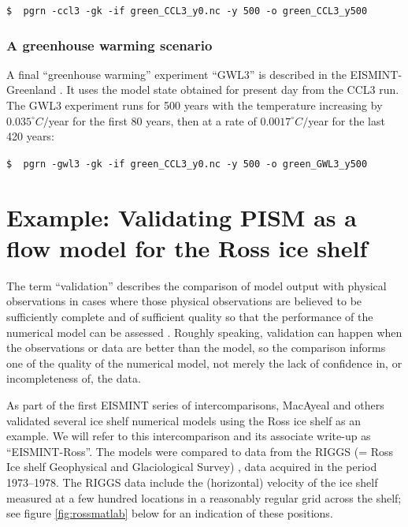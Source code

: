 \documentclass[11pt,final]{amsart}
\begin{document}
\verb|$  pgrn -ccl3 -gk -if green_CCL3_y0.nc -y 500 -o green_CCL3_y500|


\subsubsection*{A greenhouse warming scenario}  A final ``greenhouse warming'' experiment ``GWL3'' is described in the EISMINT-Greenland \cite{RitzEISMINT}.  It uses the model state obtained for present day from the CCL3 run.  The GWL3 experiment  runs for 500 years with the temperature increasing by $0.035^\circ C/$year for the first 80 years, then at a rate of $0.0017^\circ C/$year for the last 420 years:

\verb|$  pgrn -gwl3 -gk -if green_CCL3_y0.nc -y 500 -o green_GWL3_y500|



\clearpage\newpage
\section{Example: Validating PISM as a flow model for the Ross ice shelf}\label{sect:ross}     The term ``validation'' describes the comparison of model output with physical observations in cases where those physical observations are believed to be sufficiently complete and of sufficient quality so that the performance of the numerical model can be assessed \cite{Roache,Wesseling}.  Roughly speaking, validation can happen when the observations or data are better than the model, so the comparison informs one of the quality of the numerical model, not merely the lack of confidence in, or incompleteness of, the data.

As part of the first EISMINT series of intercomparisons, MacAyeal and others \cite{MacAyealetal} validated several ice shelf numerical models using the Ross ice shelf as an example.  We will refer to this intercomparison and its associate write-up \cite{MacAyealetal} as ``EISMINT-Ross''.  The models were compared to data from the RIGGS (= Ross Ice shelf Geophysical and Glaciological Survey) \cite{RIGGS2,RIGGS1}, data acquired in the period 1973--1978.   The RIGGS data include the (horizontal) velocity of the ice shelf measured at a few hundred locations in a reasonably regular grid across the shelf; see figure \ref{fig:rossmatlab} below for an indication of these positions.
\end{document}
